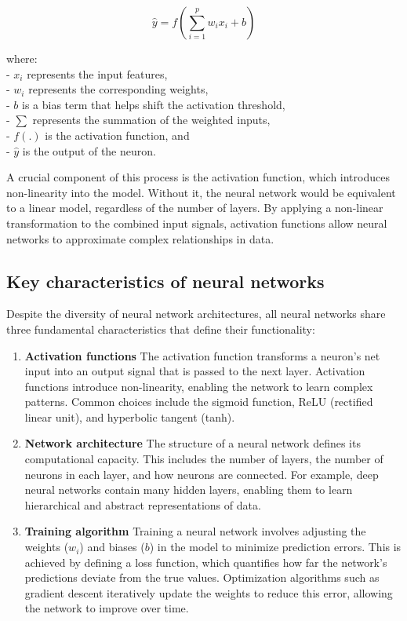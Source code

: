 \documentclass[
  11pt,
]{book}
\theoremstyle{definition}
\theoremstyle{definition}
\theoremstyle{definition}
\theoremstyle{definition}
\theoremstyle{remark}
\begin{document}
\[
\hat{y} = f\left( \sum_{i=1}^{p} w_i x_i + b \right)
\]

where:\\
- \(x_i\) represents the input features,\\
- \(w_i\) represents the corresponding weights,\\
- \(b\) is a bias term that helps shift the activation threshold,\\
- \(\sum\) represents the summation of the weighted inputs,\\
- \(f(.)\) is the activation function, and\\
- \(\hat{y}\) is the output of the neuron.

A crucial component of this process is the activation function, which introduces non-linearity into the model. Without it, the neural network would be equivalent to a linear model, regardless of the number of layers. By applying a non-linear transformation to the combined input signals, activation functions allow neural networks to approximate complex relationships in data.

\subsection*{Key characteristics of neural networks}\label{key-characteristics-of-neural-networks}


Despite the diversity of neural network architectures, all neural networks share three fundamental characteristics that define their functionality:

\begin{enumerate}
\def\labelenumi{\arabic{enumi}.}
\item
  \textbf{Activation functions} The activation function transforms a neuron's net input into an output signal that is passed to the next layer. Activation functions introduce non-linearity, enabling the network to learn complex patterns. Common choices include the sigmoid function, ReLU (rectified linear unit), and hyperbolic tangent (tanh).
\item
  \textbf{Network architecture} The structure of a neural network defines its computational capacity. This includes the number of layers, the number of neurons in each layer, and how neurons are connected. For example, deep neural networks contain many hidden layers, enabling them to learn hierarchical and abstract representations of data.
\item
  \textbf{Training algorithm} Training a neural network involves adjusting the weights (\(w_i\)) and biases (\(b\)) in the model to minimize prediction errors. This is achieved by defining a loss function, which quantifies how far the network's predictions deviate from the true values. Optimization algorithms such as gradient descent iteratively update the weights to reduce this error, allowing the network to improve over time.
\end{enumerate}
\end{document}

